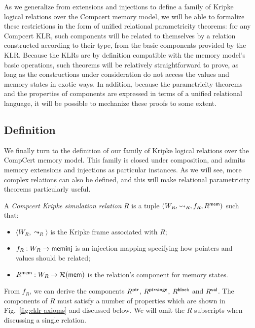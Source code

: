 As we generalize from extensions and injections
to define a family of Kripke logical relations
over the Compcert memory model,
we will be able to formalize these restrictions
in the form of unified relational parametricity theorems:
for any Compcert KLR,
such components will be related to themselves
by a relation constructed according to their type,
from the basic components provided by the KLR.
Because the KLRs are by definition compatible
with the memory model's basic operations,
such theorems will be relatively straightforward to prove,
as long as the constructions under consideration
do not access the values and memory states in exotic ways.
In addition,
because the parametricity theorems
and the properties of components
are expressed in terms of a unified relational language,
it will be possible to mechanize these proofs
to some extent.


\subsection{Definition} %

We finally turn to the definition of our family of
Kripke logical relations over the CompCert memory model.
This family is closed under composition, and
admits memory extensions and injections as particular instances.
As we will see,
more complex relations can also be defined,
and this will make relational parametricity theorems
particularly useful.

\begin{definition}
A \emph{Compcert Kripke simulation relation} $R$
is a tuple $(W_R, \leadsto_R, f_R, R^{ \textsf{mem} })$
such that:
\begin{itemize}
\item $\langle W_R, \leadsto_R \rangle$
  is the Kripke frame associated with $R$;
\item $f_R : W_R \rightarrow  \textsf{meminj} $
  is an injection mapping specifying how
  pointers and values should be related;
\item $R^{ \textsf{mem} } : W_R \rightarrow \mathcal{R}( \textsf{mem} )$
  is the relation's component for memory states.
\end{itemize}
From $f_R$,
we can derive the components
$R^{ \textsf{ptr} }$, $R^{ \textsf{ptrrange} }$, $R^{ \textsf{block} }$ and $R^{ \textsf{val} }$.
The components of $R$ must satisfy
a number of properties which are shown in Fig.~\ref{fig:cklr-axioms}
and discussed below.
We will omit the $R$ subscripts when discussing a single relation.
\end{definition}

